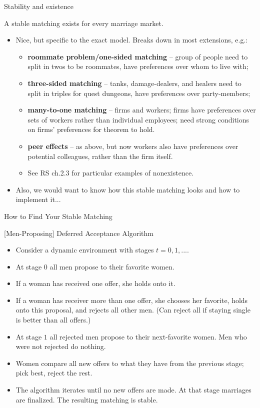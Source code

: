 \documentclass[english,10pt
,aspectratio=169
]{beamer}
\begin{document}
\begin{frame}{Stability and existence}
\begin{theorem}
	A stable matching exists for every marriage market.
\end{theorem}
\begin{itemize}
	\item Nice, but specific to the exact model. \alert{Breaks down} in most extensions, e.g.:
	\begin{itemize}
		\item \textbf{roommate problem/one-sided matching} -- group of people need to split in twos to be roommates, have preferences over whom to live with;
		\item \textbf{three-sided matching} -- tanks, damage-dealers, and healers need to split in triples for quest dungeons, have preferences over party-members;
		\item \textbf{many-to-one matching} -- firms and workers; firms have preferences over sets of workers rather than individual employees; need strong conditions on firms' preferences for theorem to hold.
		\item \textbf{peer effects} -- as above, but now workers also have preferences over potential colleagues, rather than the firm itself.
		\item See RS ch.2.3 for particular examples of nonexistence.
	\end{itemize}
	\item Also, we would want to know how this stable matching looks and how to implement it...
\end{itemize}
\end{frame}


\begin{frame}{How to Find Your Stable Matching}
\begin{block}{[Men-Proposing] Deferred Acceptance Algorithm}
	\begin{itemize}
		\item Consider a dynamic environment with stages $t=0,1,...$.
		\item At stage $0$ all men propose to their favorite women.
		\item If a woman has received one offer, she holds onto it.
		\item If a woman has receiver more than one offer, she chooses her favorite, holds onto this proposal, and rejects all other men. (Can reject all if staying single is better than all offers.)
		\item At stage $1$ all rejected men propose to their next-favorite women. Men who were not rejected do nothing.
		\item Women compare all new offers to what they have from the previous stage; pick best, reject the rest.
		\item The algorithm iterates until no new offers are made. At that stage marriages are finalized. The resulting matching is stable.
	\end{itemize}
\end{block}
\end{frame}
\end{document}
